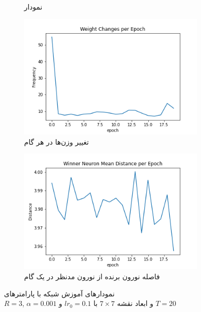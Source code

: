 \documentclass[12pt, a4paper]{article}
\begin{document}
\begin{figure}[h]
\begin{subfigure}{0.45\linewidth}
        \caption{نمودار }
    \end{subfigure}
    \newline
    \begin{subfigure}{0.45\linewidth}
        \includegraphics[width=\linewidth]{images/q5/r4/weight_change.png}
        \caption{تغییر وزن‌ها در هر گام}
    \end{subfigure}
    \hfill
    \begin{subfigure}{0.45\linewidth}
        \includegraphics[width=\linewidth]{images/q5/r4/winner_distance.png}
        \caption{فاصله نورون برنده از نورون مدنظر در یک گام}
    \end{subfigure}
    \caption{نمودار‌های آموزش شبکه  با پارامتر‌های \\$R=3$, $\alpha=0.001$ و ابعاد نقشه $7 \times 7$ با $lr_0=0.1$ و $T=20$}
    \label{r4}
\end{figure}
\end{document}
